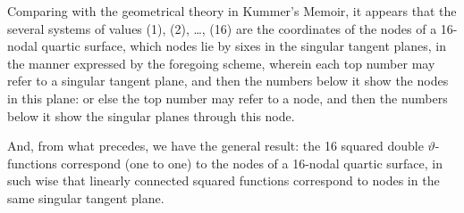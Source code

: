 \documentclass[11pt,a4paper]{article}
\begin{document}
\medskip

Comparing with the geometrical theory in Kummer's Memoir, it appears that the several systems of values (1), (2), \ldots, (16) are the coordinates of the nodes of a 16-nodal quartic surface, which nodes lie by sixes in the singular tangent planes, in the manner expressed by the foregoing scheme, wherein each top number may refer to a singular tangent plane, and then the numbers below it show the nodes in this plane: or else the top number may refer to a node, and then the numbers below it show the singular planes through this node.

\medskip

And, from what precedes, we have the general result: the 16 squared double $\vartheta$-functions correspond (one to one) to the nodes of a 16-nodal quartic surface, in such wise that linearly connected squared functions correspond to nodes in the same singular tangent plane.

\medskip
\end{document}
